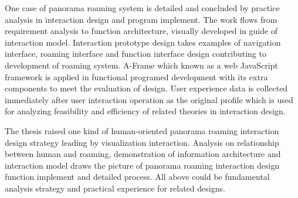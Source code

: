 \begin{enabstract}
\begin{spacing}{1.0}
One case of panorama roaming system is detailed and concluded by practice analysis in interaction design and program implement. The work flows from requirement analysis to function architecture, visually developed in guide of interaction model. Interaction prototype design takes examples of navigation interface, roaming interface and function interface design contributing to development of roaming system. A-Frame which known as a web JavaScript framework is applied in functional programed development with its extra components to meet the evaluation of design. User experience data is collected immediately after user interaction operation as the original profile which is used for analyzing feasibility and efficiency of related theories in interaction design.


The thesis raised one kind of human-oriented panorama roaming interaction design strategy leading by visualization interaction. Analysis on relationship between human and roaming, demonstration of information architecture and interaction model draws the picture of panorama roaming interaction design function implement and detailed process. All above could be fundamental analysis strategy and practical experience for related designs.

\end{spacing}
\end{enabstract}
